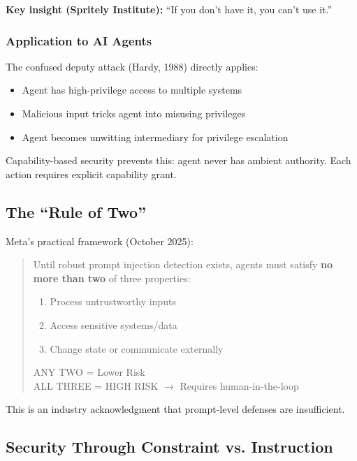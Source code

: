 \textbf{Key insight (Spritely Institute):} ``If you don't have it, you can't use it.''

\subsubsection{Application to AI Agents}

The confused deputy attack (Hardy, 1988) directly applies:
\begin{itemize}
    \item Agent has high-privilege access to multiple systems
    \item Malicious input tricks agent into misusing privileges
    \item Agent becomes unwitting intermediary for privilege escalation
\end{itemize}

Capability-based security prevents this: agent never has ambient authority. Each action requires explicit capability grant.

\subsection{The ``Rule of Two''}
\label{subsec:rule-of-two}

Meta's practical framework (October 2025):

\begin{quote}
Until robust prompt injection detection exists, agents must satisfy \textbf{no more than two} of three properties:

\begin{enumerate}
    \item[{[A]}] Process untrustworthy inputs
    \item[{[B]}] Access sensitive systems/data
    \item[{[C]}] Change state or communicate externally
\end{enumerate}

ANY TWO = Lower Risk \\
ALL THREE = HIGH RISK $\rightarrow$ Requires human-in-the-loop
\end{quote}

This is an industry acknowledgment that prompt-level defenses are insufficient.

\subsection{Security Through Constraint vs. Instruction}
\label{subsec:constraint-vs-instruction}

